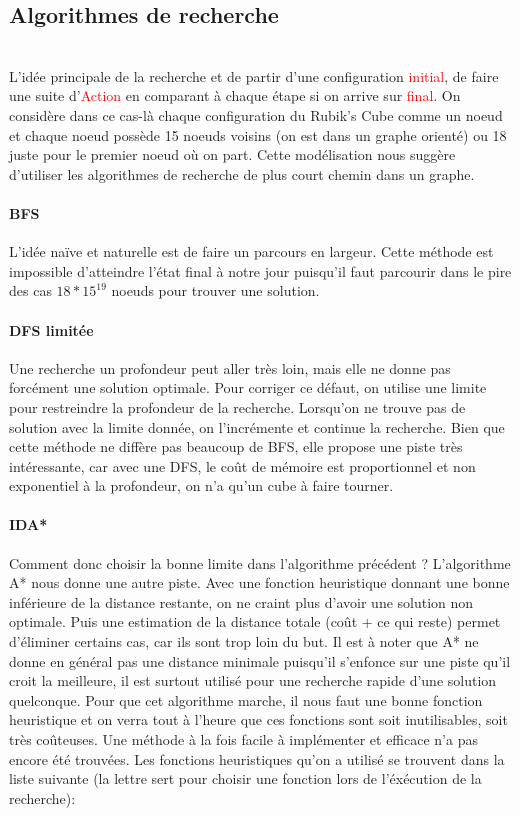 \documentclass[fleqn,10pt,french]{SelfArx} %
\newcommand{\class}[1]{\colorbox{bg}{\textcolor{red}{\usefont{OT1}{cmtt}{m}{n}#1}}}
\begin{document}
\subsection{Algorithmes de recherche}

~\\\indent
L’idée principale de la recherche et de partir d’une configuration \class{initial}, de faire une suite d’\class{Action} en comparant à chaque étape si on arrive sur \class{final}. On considère dans ce cas-là chaque configuration du Rubik’s Cube comme un noeud et chaque noeud possède 15 noeuds voisins (on est dans un graphe orienté) ou 18 juste pour le premier noeud où on part. Cette modélisation nous suggère d’utiliser les algorithmes de recherche de plus court chemin dans un graphe.

\paragraph{BFS}
L’idée naïve et naturelle est de faire un parcours en largeur. Cette méthode est impossible d’atteindre l’état final à notre jour puisqu’il faut parcourir dans le pire des cas $18*15^{19}$ noeuds pour trouver une solution. 

\paragraph{DFS limitée}
Une recherche un profondeur peut aller très loin, mais elle ne donne pas forcément une solution optimale. Pour corriger ce défaut, on utilise une limite pour restreindre la profondeur de la recherche. Lorsqu’on ne trouve pas de solution avec la limite donnée, on l’incrémente et continue la recherche. Bien que cette méthode ne diffère pas beaucoup de BFS, elle propose une piste très intéressante, car avec une DFS, le coût de mémoire est proportionnel et non exponentiel à la profondeur, on n’a qu’un cube à faire tourner. 

\paragraph{IDA*}
Comment donc choisir la bonne limite dans l’algorithme précédent ? L’algorithme A* nous donne une autre piste. Avec une fonction heuristique donnant une bonne inférieure de la distance restante, on ne craint plus d’avoir une solution non optimale. Puis une estimation de la distance totale (coût + ce qui reste) permet d’éliminer certains cas, car ils sont trop loin du but. Il est à noter que A* ne donne en général pas une distance minimale puisqu’il s’enfonce sur une piste qu’il croit la meilleure, il est surtout utilisé pour une recherche rapide d’une solution quelconque. Pour que cet algorithme marche, il nous faut une bonne fonction heuristique et on verra tout à l’heure que ces fonctions sont soit inutilisables, soit très coûteuses. Une méthode à la fois facile à implémenter et efficace n’a pas encore été trouvées. Les fonctions heuristiques qu’on a utilisé se trouvent dans la liste suivante (la lettre sert pour choisir une fonction lors de l’éxécution de la recherche): 
\end{document}
